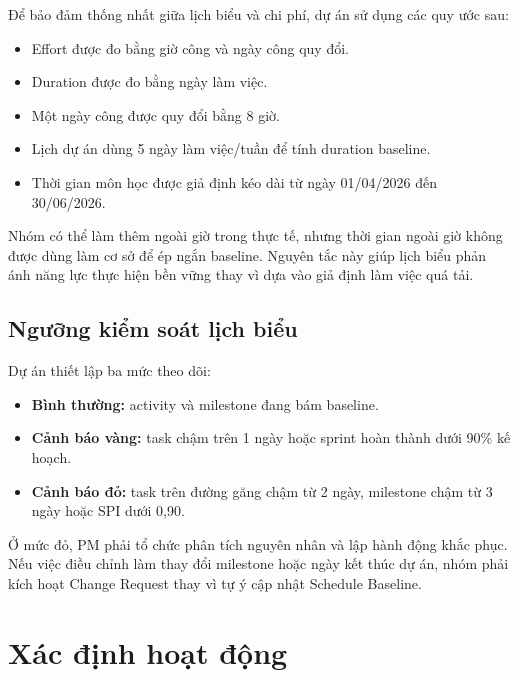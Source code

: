 Để bảo đảm thống nhất giữa lịch biểu và chi phí, dự án sử dụng các quy ước sau:

\begin{itemize}
  \item Effort được đo bằng giờ công và ngày công quy đổi.
  \item Duration được đo bằng ngày làm việc.
  \item Một ngày công được quy đổi bằng 8 giờ.
  \item Lịch dự án dùng 5 ngày làm việc/tuần để tính duration baseline.
  \item Thời gian môn học được giả định kéo dài từ ngày 01/04/2026 đến 30/06/2026.
\end{itemize}

Nhóm có thể làm thêm ngoài giờ trong thực tế, nhưng thời gian ngoài giờ không được dùng làm cơ sở để ép ngắn baseline. Nguyên tắc này giúp lịch biểu phản ánh năng lực thực hiện bền vững thay vì dựa vào giả định làm việc quá tải.

\subsection{Ngưỡng kiểm soát lịch biểu}

Dự án thiết lập ba mức theo dõi:

\begin{itemize}
  \item \textbf{Bình thường:} activity và milestone đang bám baseline.
  \item \textbf{Cảnh báo vàng:} task chậm trên 1 ngày hoặc sprint hoàn thành dưới 90\% kế hoạch.
  \item \textbf{Cảnh báo đỏ:} task trên đường găng chậm từ 2 ngày, milestone chậm từ 3 ngày hoặc SPI dưới 0,90.
\end{itemize}

Ở mức đỏ, PM phải tổ chức phân tích nguyên nhân và lập hành động khắc phục. Nếu việc điều chỉnh làm thay đổi milestone hoặc ngày kết thúc dự án, nhóm phải kích hoạt Change Request thay vì tự ý cập nhật Schedule Baseline.


\section{Xác định hoạt động}

